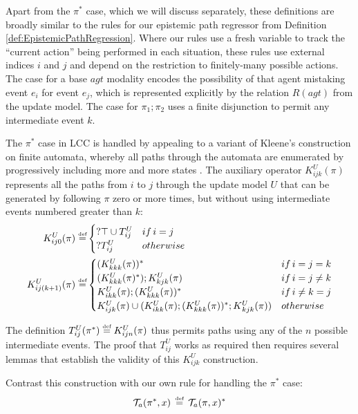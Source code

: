 Apart from the $\pi^{*}$ case, which we will discuss separately,
these definitions are broadly similar to the rules for our epistemic
path regressor from Definition \ref{def:EpistemicPathRegression}.
Where our rules use a fresh variable to track the {}``current action''
being performed in each situation, these rules use external indices
$i$ and $j$ and depend on the restriction to finitely-many possible
actions. The case for a base $agt$ modality encodes the possibility
of that agent mistaking event $e_{i}$ for event $e_{j}$, which is
represented explicitly by the relation $R(agt)$ from the update model.
The case for $\pi_{1};\pi_{2}$ uses a finite disjunction to permit
any intermediate event $k$.

The $\pi^{*}$ case in LCC is handled by appealing to a variant of
Kleene's construction on finite automata, whereby all paths through
the automata are enumerated by progressively including more and more
states \citep[ Theorem 2.5.1]{lewis81theory_of_computation}. The
auxiliary operator $K_{ijk}^{U}(\pi)$ represents all the paths from
$i$ to $j$ through the update model $U$ that can be generated by
following $\pi$ zero or more times, but without using intermediate
events numbered greater than $k$:\begin{align*}
K_{ij0}^{U}(\pi)\stackrel{\mbox{\tiny def}}{=} & \begin{cases}
?\top\cup T_{ij}^{U} & if\, i=j\\
?T_{ij}^{U} & otherwise\end{cases}\\
K_{ij(k+1)}^{U}(\pi)\stackrel{\mbox{\tiny def}}{=} & \begin{cases}
(K_{kkk}^{U}(\pi))^{*} & if\, i=j=k\\
(K_{kkk}^{U}(\pi)^{*});K_{kjk}^{U}(\pi) & if\, i=j\neq k\\
K_{ikk}^{U}(\pi);(K_{kkk}^{U}(\pi))^{*} & if\, i\neq k=j\\
K_{ijk}^{U}(\pi)\cup(K_{ikk}^{U}(\pi);(K_{kkk}^{U}(\pi))^{*};K{}_{kjk}^{U}(\pi)) & otherwise\end{cases}\end{align*}


The definition $T_{ij}^{U}(\pi^{*})\stackrel{\mbox{\tiny def}}{=} K_{ijn}^{U}(\pi)$ thus
permits paths using any of the $n$ possible intermediate events.
The proof that $T_{ij}^{U}$ works as required then requires several
lemmas that establish the validity of this $K_{ijk}^{U}$ construction.

Contrast this construction with our own rule for handling the $\pi^{*}$
case:\[
\mathcal{T}_{a}(\pi^{*},x)\,\stackrel{\mbox{\tiny def}}{=}\,\mathcal{T}_{a}(\pi,x)^{*}\]


